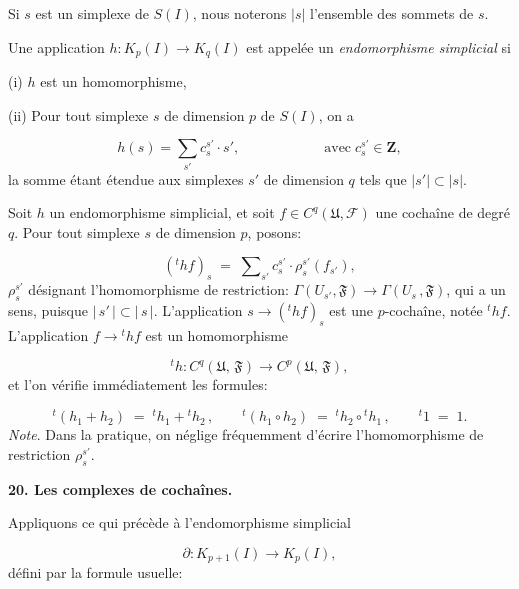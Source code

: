 Si $s$ est un simplexe de $S(I)$, nous noterons $| s |$ l'ensemble des sommets de $s$.

Une application $h : K_p(I) \to K_q(I)$ est appelée un \textit{endomorphisme simplicial} si

(i) $h$ est un homomorphisme,

(ii) Pour tout simplexe $s$ de dimension $p$ de $S(I)$, on a

\begin{equation*}
h(s) = \sum_{s'} c_s^{s'} \cdot s', \qquad\qquad\qquad \mathrm{avec}\; c_s^{s'} \in \mathbf{Z} ,
\end{equation*}
la somme étant étendue aux simplexes $s'$ de dimension $q$ tels que $| s' | \subset | s |$.

Soit $h$ un endomorphisme simplicial, et soit $f \in C^q(\mathfrak{U}, \mathcal{F})$ une cochaîne de
degré $q$. Pour tout simplexe $s$ de dimension $p$, posons:

\begin{equation*}
({}^{t}hf)_{s} \;=\; \sum\nolimits_{s'} c_{s}^{s'} \cdot \rho_{s}^{s'}(f_{s'}),
\end{equation*}
$\rho_s^{s'}$ désignant l'homomorphisme de restriction: $\Gamma(U_{s'}, \mathfrak{F}) \to \Gamma(U_{s}\,, \mathfrak{F})$, qui a un sens, puisque $|\,s'\,| \subset |\,s\,|$. L'application $s \to ({}^{t}hf)_{s}$ est une $p$-cochaîne, notée ${}^{t}hf$. L'application $f \to {}^{t}hf$ est un homomorphisme

\begin{equation*}
{}^{t}h : C^{q}(\mathfrak{U},\, \mathfrak{F}) \to C^{p}(\mathfrak{U},\, \mathfrak{F}),
\end{equation*}
et l'on vérifie immédiatement les formules:

\begin{equation*}
{}^{t}(h_{1} + h_{2}) \;=\; {}^{t}h_{1} + {}^{t}h_{2}\,, \qquad {}^{t}(h_{1} \circ h_{2}) \;=\; {}^{t}h_{2} \circ {}^{t}h_{1}\,, \qquad {}^{t}1 \;=\; 1.
\end{equation*}
\textit{Note}. Dans la pratique, on néglige fréquemment d'écrire l'homomorphisme de restriction $\rho_{s}^{s'}$.


\textbf{20. Les complexes de cochaînes.}

Appliquons ce qui précède à l'endomorphisme simplicial

\begin{equation*}
\partial : K_{p+1}(I) \to K_{p}(I),
\end{equation*}
défini par la formule usuelle:


